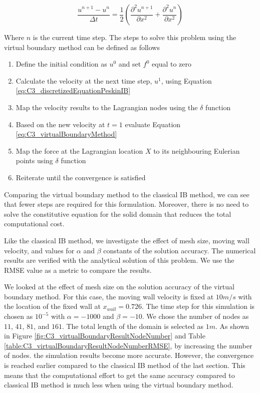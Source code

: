 \begin{equation}\label{eq:C3_virtualBoundaryDiscretization}
    \frac{u^{n+1} - u^n}{\Delta t} = 
    \frac{1}{2}
    \left(
    \frac{\partial^2 u^{n+1}}{\partial x^2} +
    \frac{\partial^2 u^{n}}{\partial x^2}
    \right)
\end{equation}

Where $n$ is the current time step. The steps to solve this problem using the virtual boundary method can be defined as follows

\begin{enumerate}
    \item Define the initial condition as $u^0$ and set $f^0$ equal to zero
    \item Calculate the velocity at the next time step, $u^1$, using Equation \eqref{eq:C3_discretizedEquationPeskinIB}
    \item Map the velocity results to the Lagrangian nodes using the $\delta$ function
    \item Based on the new velocity at $t=1$ evaluate Equation \eqref{eq:C3_virtualBoundaryMethod}
    \item Map the force at the Lagrangian location $X$ to its neighbouring Eulerian points using $\delta$ function
    \item Reiterate until the convergence is satisfied
\end{enumerate}

Comparing the virtual boundary method to the classical IB method, we can see that fewer steps are required for this formulation. Moreover, there is no need to solve the constitutive equation for the solid domain that reduces the total computational cost.

Like the classical IB method, we investigate the effect of mesh size, moving wall velocity, and values for $\alpha$ and $\beta$ constants of the solution accuracy. The numerical results are verified with the analytical solution of this problem. We use the RMSE value as a metric to compare the results.

We looked at the effect of mesh size on the solution accuracy of the virtual boundary method. For this case, the moving wall velocity is fixed at $10 m/s$ with the location of the fixed wall at $x_{wall} = 0.726$. The time step for this simulation is chosen as $10^{-5}$ with $\alpha = -1000$ and $\beta = -10$. We chose the number of nodes as $11$, $41$, $81$, and $161$. The total length of the domain is selected as $1 m$. As shown in Figure \ref{fig:C3_virtualBoundaryResultNodeNumber} and Table \ref{table:C3_virtualBoundaryResultNodeNumberRMSE}, by increasing the number of nodes. the simulation results become more accurate. However, the convergence is reached earlier compared to the classical IB method of the last section. This means that the computational effort to get the same accuracy compared to classical IB method is much less when using the virtual boundary method. 

